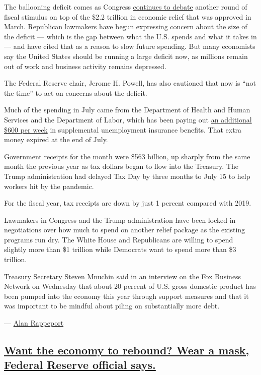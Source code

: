 The ballooning deficit comes as Congress
\href{https://www.nytimes3xbfgragh.onion/2020/08/11/us/politics/congress-coronavirus-relief-bill.html}{continues
to debate} another round of fiscal stimulus on top of the \$2.2 trillion
in economic relief that was approved in March. Republican lawmakers have
begun expressing concern about the size of the deficit --- which is the
gap between what the U.S. spends and what it takes in --- and have cited
that as a reason to slow future spending. But many economists say the
United States should be running a large deficit now, as millions remain
out of work and business activity remains depressed.

The Federal Reserve chair, Jerome H. Powell, has also cautioned that now
is ``not the time'' to act on concerns about the deficit.

Much of the spending in July came from the Department of Health and
Human Services and the Department of Labor, which has been paying out
\href{https://www.nytimes3xbfgragh.onion/interactive/2020/07/24/business/economy/600-unemployment-benefits.html}{an
additional \$600 per week} in supplemental unemployment insurance
benefits. That extra money expired at the end of July.

Government receipts for the month were \$563 billion, up sharply from
the same month the previous year as tax dollars began to flow into the
Treasury. The Trump administration had delayed Tax Day by three months
to July 15 to help workers hit by the pandemic.

For the fiscal year, tax receipts are down by just 1 percent compared
with 2019.

Lawmakers in Congress and the Trump administration have been locked in
negotiations over how much to spend on another relief package as the
existing programs run dry. The White House and Republicans are willing
to spend slightly more than \$1 trillion while Democrats want to spend
more than \$3 trillion.

Treasury Secretary Steven Mnuchin said in an interview on the Fox
Business Network on Wednesday that about 20 percent of U.S. gross
domestic product has been pumped into the economy this year through
support measures and that it was important to be mindful about piling on
substantially more debt.

--- \href{https://www.nytimes3xbfgragh.onion/by/alan-rappeport}{Alan
Rappeport}

\hypertarget{want-the-economy-to-rebound-wear-a-mask-federal-reserve-official-says}{%
\subsection{\texorpdfstring{\protect\hyperlink{want-the-economy-to-rebound-wear-a-mask-federal-reserve-official-says}{Want
the economy to rebound? Wear a mask, Federal Reserve official
says.}}{Want the economy to rebound? Wear a mask, Federal Reserve official says.}}\label{want-the-economy-to-rebound-wear-a-mask-federal-reserve-official-says}}

